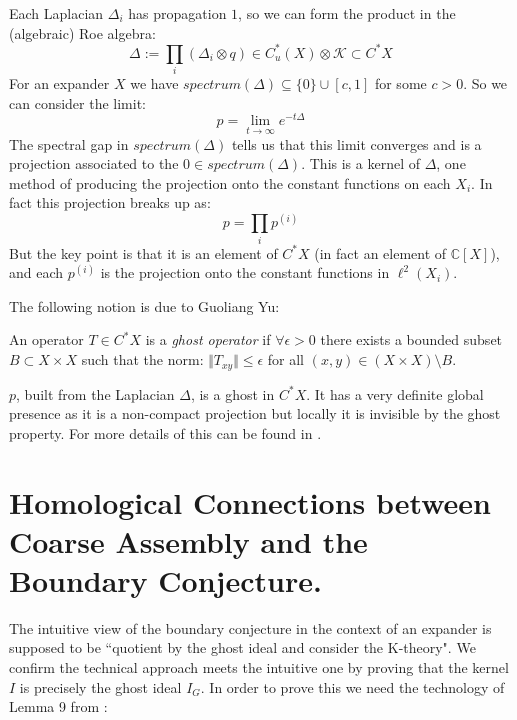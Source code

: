 \begin{remark}\label{Rem:Ghost}
Each Laplacian $\Delta_{i}$ has propagation $1$, so we can form the product in the (algebraic) Roe algebra:
\begin{equation*}
\Delta:=\prod_{i}(\Delta_{i} \otimes q) \in C^{*}_{u}(X)\otimes \mathcal{K} \subset C^{*}X
\end{equation*}
For an expander $X$ we have $spectrum(\Delta) \subseteq \lbrace 0 \rbrace \cup [c,1]$ for some $c>0$. So we can consider the limit:
\begin{equation*}
p = \lim_{t \rightarrow \infty}e^{-t\Delta}
\end{equation*}
The spectral gap in $spectrum(\Delta)$ tells us that this limit converges and is a projection associated to the $0 \in spectrum(\Delta)$. This is a kernel of $\Delta$, one method of producing the projection onto the constant functions on each $X_{i}$. In fact this projection breaks up as:
\begin{equation*}
p=\prod_{i}p^{(i)}
\end{equation*}
But the key point is that it is an element of $C^{*}X$ (in fact an element of $\mathbb{C}[X]$), and each $p^{(i)}$ is the projection onto the constant functions in $\ell^{2}(X_{i})$. 

The following notion is due to Guoliang Yu:

\begin{definition}
An operator $T \in C^{*}X$ is a \textit{ghost operator} if $\forall \epsilon >0$ there exists a bounded subset $B \subset X\times X$ such that the norm: $\Vert T_{xy} \Vert \leq \epsilon$ for all $(x,y) \in (X\times X) \setminus B$.
\end{definition}

$p$, built from the Laplacian $\Delta$, is a ghost in $C^{*}X$. It has a very definite global presence as it is a non-compact projection but locally it is invisible by the ghost property. For more details of this can be found in \cite[Section 5]{explg1}.
\end{remark}

\section{Homological Connections between Coarse Assembly and the Boundary Conjecture.}

The intuitive view of the boundary conjecture in the context of an expander is supposed to be ``quotient by the ghost ideal and consider the K-theory". We confirm the technical approach meets the intuitive one by proving that the kernel $I$ is precisely the ghost ideal $I_{G}$. In order to prove this we need the technology of Lemma 9 from \cite{MR1911663}:

